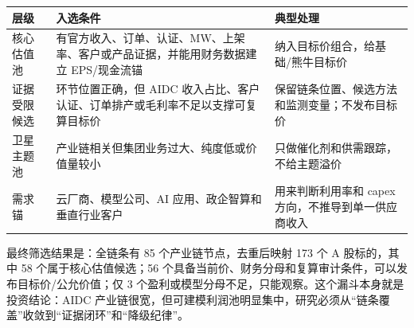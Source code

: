 \begin{exhibitbox}[从全景池到核心估值池的筛选规则]
\begin{tabularx}{\textwidth}{L{3.0cm}X X}
\toprule
\textbf{层级} & \textbf{入选条件} & \textbf{典型处理}\\
\midrule
核心估值池 & 有官方收入、订单、认证、MW、上架率、客户或产品证据，并能用财务数据建立 EPS/现金流锚 & 纳入目标价组合，给基础/熊牛目标价\\
证据受限候选 & 环节位置正确，但 AIDC 收入占比、客户认证、订单排产或毛利率不足以支撑可复算目标价 & 保留链条位置、候选方法和监测变量；不发布目标价\\
卫星主题池 & 产业链相关但集团业务过大、纯度低或价值量较小 & 只做催化剂和供需跟踪，不给主题溢价\\
需求锚 & 云厂商、模型公司、AI 应用、政企智算和垂直行业客户 & 用来判断利用率和 capex 方向，不推导到单一供应商收入\\
\bottomrule
\end{tabularx}
\end{exhibitbox}

最终筛选结果是：全链条有 85 个产业链节点，去重后映射 173 个 A 股标的，其中 58 个属于核心估值候选；56 个具备当前价、财务分母和复算审计条件，可以发布目标价/公允价值；仅 3 个盈利或模型分母不足，只能观察。这个漏斗本身就是投资结论：AIDC 产业链很宽，但可建模利润池明显集中，研究必须从“链条覆盖”收敛到“证据闭环”和“降级纪律”。
